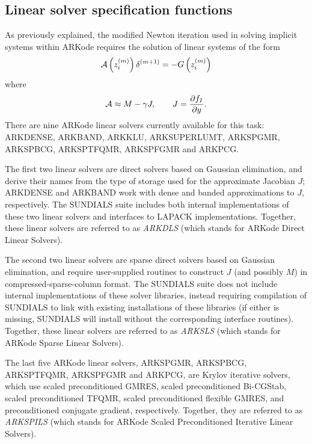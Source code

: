 \documentclass[letterpaper,10pt,english]{sphinxmanual}
\begin{document}
\subsection{Linear solver specification functions}
\label{c_interface/User_callable:cinterface-linearsolvers}\label{c_interface/User_callable:linear-solver-specification-functions}
As previously explained, the modified Newton iteration used in solving
implicit systems within ARKode requires the solution of linear
systems of the form
\begin{gather}
\begin{split}{\mathcal A}\left(z_i^{(m)}\right) \delta^{(m+1)} = -G\left(z_i^{(m)}\right)\end{split}\notag
\end{gather}
where
\begin{gather}
\begin{split}{\mathcal A} \approx M - \gamma J, \qquad J = \frac{\partial f_I}{\partial y}.\end{split}\notag
\end{gather}
There are nine ARKode linear solvers currently available for this
task: ARKDENSE, ARKBAND, ARKKLU, ARKSUPERLUMT, ARKSPGMR, ARKSPBCG,
ARKSPTFQMR, ARKSPFGMR and ARKPCG.

The first two linear solvers are direct solvers based on Gaussian
elimination, and derive their names from the type of storage used for
the approximate Jacobian \(J\); ARKDENSE and ARKBAND work with
dense and banded approximations to \(J\), respectively. The
SUNDIALS suite includes both internal implementations of these two
linear solvers and interfaces to LAPACK implementations. Together,
these linear solvers are referred to as \emph{ARKDLS} (which stands for
ARKode Direct Linear Solvers).

The second two linear solvers are sparse direct solvers based on
Gaussian elimination, and require user-supplied routines to construct
\(J\) (and possibly \(M\)) in compressed-sparse-column
format.  The SUNDIALS suite does not include internal implementations
of these solver libraries, instead requiring compilation of SUNDIALS
to link with existing installations of these libraries (if either is
missing, SUNDIALS will install without the corresponding interface
routines).  Together, these linear solvers are referred to as \emph{ARKSLS}
(which stands for ARKode Sparse Linear Solvers).

The last five ARKode linear solvers, ARKSPGMR, ARKSPBCG, ARKSPTFQMR,
ARKSPFGMR and ARKPCG, are Krylov iterative solvers, which use scaled
preconditioned GMRES, scaled preconditioned Bi-CGStab, scaled
preconditioned TFQMR, scaled preconditioned flexible GMRES, and
preconditioned conjugate gradient, respectively.  Together, they are
referred to as \emph{ARKSPILS} (which stands for ARKode Scaled
Preconditioned Iterative Linear Solvers).
\end{document}
